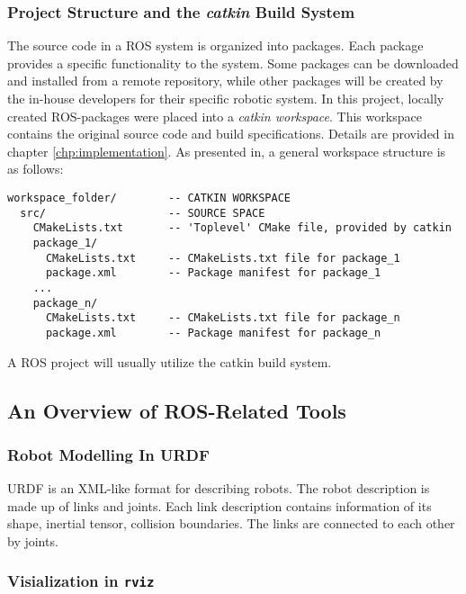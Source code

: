 \subsubsection{Project Structure and the \textit{catkin} Build System}

The source code in a \ac{ROS} system is organized into packages. Each package provides a specific functionality to the system. Some packages can be downloaded and installed from a remote repository, while other packages will be created by the in-house developers for their specific robotic system. In this project, locally created ROS-packages were placed into a \textit{catkin workspace}. This workspace contains the  original source code and build specifications. Details are provided in chapter \ref{chp:implementation}. As presented in\cite{ROS_tut_pkg}, a general workspace structure is as follows:

\begin{verbatim}
workspace_folder/        -- CATKIN WORKSPACE
  src/                   -- SOURCE SPACE
    CMakeLists.txt       -- 'Toplevel' CMake file, provided by catkin
    package_1/
      CMakeLists.txt     -- CMakeLists.txt file for package_1
      package.xml        -- Package manifest for package_1
    ...
    package_n/
      CMakeLists.txt     -- CMakeLists.txt file for package_n
      package.xml        -- Package manifest for package_n
\end{verbatim}

A \ac{ROS} project will usually utilize the catkin build system.



\subsection{An Overview of ROS-Related Tools}

\subsubsection{Robot Modelling In URDF}

\ac{URDF} is an XML-like format for describing robots. The robot description is made up of links and joints. Each link description contains information of its shape, inertial tensor, collision boundaries. The links are connected to each other by joints.

\subsubsection{Visialization in \texttt{rviz}}

